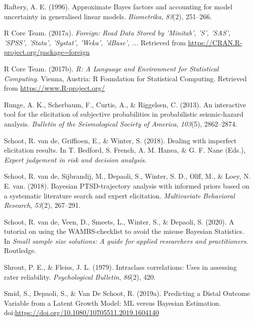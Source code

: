 \documentclass[openright,titlepage,12pt,a4paper]{book}
\begin{document}
\leavevmode\hypertarget{ref-raftery_approximate_1996}{}%
Raftery, A. E. (1996). Approximate Bayes factors and accounting for model uncertainty in generalised linear models. \emph{Biometrika}, \emph{83}(2), 251--266.

\leavevmode\hypertarget{ref-r_core_team_foreign:_2017}{}%
R Core Team. (2017a). \emph{Foreign: Read Data Stored by 'Minitab', 'S', 'SAS', 'SPSS', 'Stata', 'Systat', 'Weka', 'dBase', ...} Retrieved from \url{https://CRAN.R-project.org/package=foreign}

\leavevmode\hypertarget{ref-r_core_team_r:_2017}{}%
R Core Team. (2017b). \emph{R: A Language and Environment for Statistical Computing}. Vienna, Austria: R Foundation for Statistical Computing. Retrieved from \url{https://www.R-project.org/}

\leavevmode\hypertarget{ref-runge_interactive_2013}{}%
Runge, A. K., Scherbaum, F., Curtis, A., \& Riggelsen, C. (2013). An interactive tool for the elicitation of subjective probabilities in probabilistic seismic‐hazard analysis. \emph{Bulletin of the Seismological Society of America}, \emph{103}(5), 2862--2874.

\leavevmode\hypertarget{ref-van_de_schoot_dealing_2018}{}%
Schoot, R. van de, Griffioen, E., \& Winter, S. (2018). Dealing with imperfect elicitation results. In T. Bedford, S. French, A. M. Hanea, \& G. F. Nane (Eds.), \emph{Expert judgement in risk and decision analysis}.

\leavevmode\hypertarget{ref-van_de_schoot_bayesian_2018}{}%
Schoot, R. van de, Sijbrandij, M., Depaoli, S., Winter, S. D., Olff, M., \& Loey, N. E. van. (2018). Bayesian PTSD-trajectory analysis with informed priors based on a systematic literature search and expert elicitation. \emph{Multivariate Behavioral Research}, \emph{53}(2), 267--291.

\leavevmode\hypertarget{ref-van_de_schoot_tutorial_2020}{}%
Schoot, R. van de, Veen, D., Smeets, L., Winter, S., \& Depaoli, S. (2020). A tutorial on using the WAMBS-checklist to avoid the misuse Bayesian Statistics. In \emph{Small sample size solutions: A guide for applied researchers and practitioners}. Routledge.

\leavevmode\hypertarget{ref-shrout_intraclass_1979}{}%
Shrout, P. E., \& Fleiss, J. L. (1979). Intraclass correlations: Uses in assessing rater reliability. \emph{Psychological Bulletin}, \emph{86}(2), 420.

\leavevmode\hypertarget{ref-smid_predicting_2019}{}%
Smid, S., Depaoli, S., \& Van De Schoot, R. (2019a). Predicting a Distal Outcome Variable from a Latent Growth Model: ML versus Bayesian Estimation. doi:\href{https://doi.org/https://doi.org/10.1080/10705511.2019.1604140}{https://doi.org/10.1080/10705511.2019.1604140}
\end{document}
